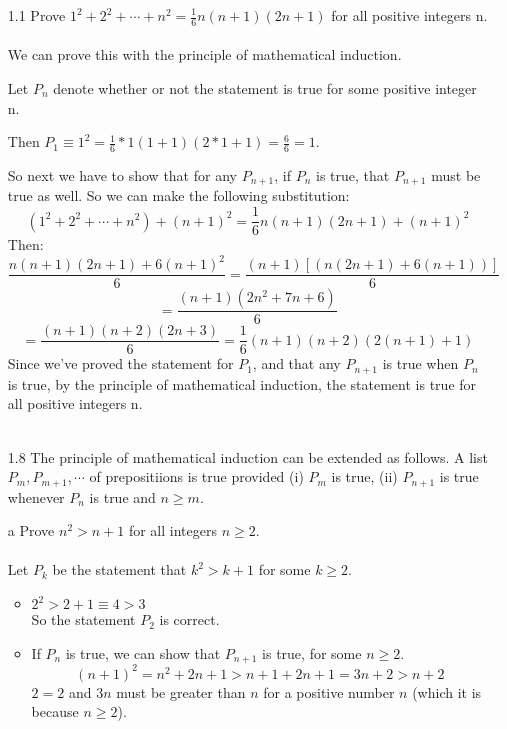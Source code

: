 
\usepackage{amsmath, dsfont}

\oddsidemargin 0in
\evensidemargin 0in
\textwidth 6.5in
\topmargin -0.5in
\textheight 9.0in
\newcommand{\norm}[1]{\left\lVert #1 \right\rVert}
\newcommand{\?}{\stackrel{?}{=}}



\pagestyle{myheadings}

\begin{itemize}
  \item [1.1]
    Prove $1^2 + 2^2 + \cdots + n^2 = \frac{1}{6} n (n+1)(2n+1)$ for all positive integers n.\\\\

    We can prove this with the principle of mathematical induction.
    
    Let $P_n$ denote whether or not the statement is true for some positive integer n. 

    Then $P_1 \equiv 1^2 = \frac{1}{6} * 1(1 + 1)(2*1 + 1) = \frac{6}{6} = 1$.

    So next we have to show that for any $P_{n+1}$, if $P_n$ is true, that $P_{n+1}$ must be true as well. So we can make the following substitution:\\
    $$(1^2 + 2^2 + \cdots + n^2) + (n+1)^2 = \frac{1}{6}n(n+1)(2n+1) + (n+1)^2$$
    Then:
    $$\frac{n(n+1)(2n+1) + 6(n+1)^2}{6} = \frac{(n+1)[(n(2n+1) + 6(n+1))]}{6}$$
    $$ = \frac{(n+1)(2n^2+7n+6)}{6}$$
    $$ = \frac{(n+1)(n+2)(2n+3)}{6} = \frac{1}{6}(n+1)(n+2)(2(n+1) + 1)$$
    Since we've proved the statement for $P_1$, and that any $P_{n+1}$ is true when $P_n$ is true, by the principle of mathematical induction, the statement is true for all positive integers n.\\\\


  \item [1.8]
    The principle of mathematical induction can be extended as follows. A list $P_m, P_{m+1}, \cdots$ of prepositiions is true provided (i) $P_m$ is true, (ii) $P_{n+1}$ is true whenever $P_n$ is true and $n \geq m$.
    \item [a] Prove $n^2 > n + 1$ for all integers $n \geq 2$. \\\\
      
      Let $P_k$ be the statement that $k^2 > k + 1$ for some $k \geq 2$.
      \begin{itemize}
        \item
          $2^2 > 2 + 1 \equiv 4 > 3$\\
          So the statement $P_2$ is correct.
        \item
          If $P_n$ is true, we can show that $P_{n+1}$ is true, for some $n \geq 2$.
          $$(n+1)^2 = n^2 + 2n + 1 > n + 1 + 2n + 1 = 3n + 2 > n + 2$$
          $2 = 2$ and $3n$ must be greater than $n$ for a positive number $n$ (which it is because $n \geq 2$).\\          
      \end{itemize}


\end{itemize}
